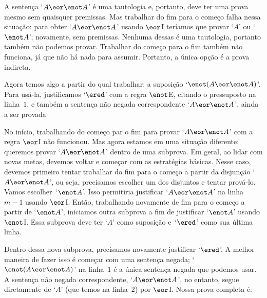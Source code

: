A sentença `$A \eor \enot A$' é uma tautologia e, portanto, deve ter uma prova mesmo sem quaisquer premissas. Mas trabalhar do fim para o começo falha nessa situação: para obter `$A \eor \enot A$' usando $\eor$I teríamos que provar `$A$' ou `$\enot A$'; novamente, sem premissas. Nenhuma dessas é uma tautologia, portanto também não podemos provar. Trabalhar  do começo para o fim também não funciona, já que não há nada para assumir. Portanto, a única opção é a prova indireta.
\begin{fitchproof}
	\open
	\ellipsesline
	\close
\end{fitchproof}
Agora temos algo a partir do qual trabalhar: a suposição  `$\enot(A \eor \enot A)$'. Para usá-la, justificamos `$\ered$' com a regra $\enot$E, citando o pressuposto na linha~$1$, e também a sentença não negada correspondente `$A \eor \enot A$', ainda a ser provada
\begin{fitchproof}
	\open
	\ellipsesline
	\close
\end{fitchproof}


No início, trabalhando  do começo par o fim para provar `$A \eor\enot A$' com a regra $\eor$I não funcionou. Mas agora estamos em uma situação diferente: queremos provar `$A \eor\enot A$' dentro de uma subprova. Em geral, ao lidar com novas metas, devemos voltar e começar com as estratégias básicas. Nesse caso, devemos primeiro tentar trabalhar do fim para o começo a partir da disjunção `$A \eor \enot A$', ou seja, precisamos escolher um dos disjuntos  e tentar prová-lo. Vamos escolher~`$\enot A$'. Isso permitiria justificar `$A \eor \enot A$' na linha~$m - 1$ usando $\eor$I. Então, trabalhando novamente de fim para o começo a partir de `$\enot A$', iniciamos outra subprova a fim de justificar  `$\enot A$' usando $\enot$I. Essa subprova deve ter `$A$' como suposição e~`$\ered$' como sua última linha.
\begin{fitchproof}
	\open
	\open
	\ellipsesline
	\close
	\close
\end{fitchproof}
Dentro dessa nova subprova, precisamos novamente justificar `$\ered$'. A melhor maneira de fazer isso é começar com uma sentença negada; `$\enot(A \eor \enot A)$' na linha~$1$ é a única sentença negada que podemos usar. A sentença não negada correspondente,  `$A \eor \enot A$', no entanto, segue diretamente de `$A$' (que temos na linha~$2$) por $\eor$I. Nossa prova completa é:
\begin{fitchproof}
	\open
	\open
	\close
	\close
\end{fitchproof}

